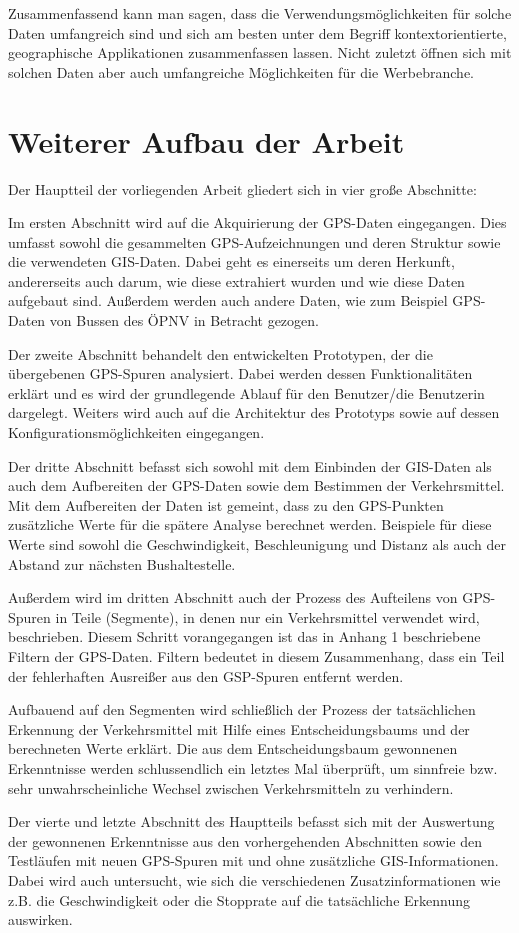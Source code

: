 Zusammenfassend kann man sagen, dass die Verwendungsmöglichkeiten für solche Daten umfangreich sind und sich am besten unter dem Begriff kontextorientierte, geographische Applikationen  zusammenfassen lassen. Nicht zuletzt öffnen sich mit solchen Daten aber auch umfangreiche Möglichkeiten für die Werbebranche.

\section{Weiterer Aufbau der Arbeit}
Der Hauptteil der vorliegenden Arbeit gliedert sich in vier große Abschnitte:

Im ersten Abschnitt wird auf die Akquirierung der GPS-Daten eingegangen. Dies umfasst sowohl die gesammelten GPS-Aufzeichnungen und deren Struktur sowie die verwendeten GIS-Daten. Dabei geht es einerseits um deren Herkunft, andererseits auch darum, wie diese extrahiert wurden und wie diese Daten aufgebaut sind. Außerdem werden auch andere Daten, wie zum Beispiel GPS-Daten von Bussen des ÖPNV in Betracht gezogen.

Der zweite Abschnitt behandelt den entwickelten Prototypen, der die übergebenen GPS-Spuren analysiert. Dabei werden dessen Funktionalitäten erklärt und es wird der grundlegende Ablauf für den Benutzer/die Benutzerin dargelegt. Weiters wird auch auf die Architektur des Prototyps sowie auf dessen Konfigurationsmöglichkeiten eingegangen.

Der dritte Abschnitt befasst sich sowohl mit dem Einbinden der GIS-Daten als auch dem Aufbereiten der GPS-Daten sowie dem Bestimmen der Verkehrsmittel. Mit dem Aufbereiten der Daten ist gemeint, dass zu den GPS-Punkten zusätzliche Werte für die spätere Analyse berechnet werden. Beispiele für diese Werte sind sowohl die Geschwindigkeit, Beschleunigung und Distanz als auch der Abstand zur nächsten Bushaltestelle. 

Außerdem wird im dritten Abschnitt auch der Prozess des Aufteilens von GPS-Spuren in Teile (Segmente), in denen nur ein Verkehrsmittel verwendet wird, beschrieben. Diesem Schritt vorangegangen ist das in Anhang 1 beschriebene Filtern der GPS-Daten. Filtern bedeutet in diesem Zusammenhang, dass ein Teil der fehlerhaften Ausreißer aus den GSP-Spuren entfernt werden.

Aufbauend auf den Segmenten wird schließlich der Prozess der tatsächlichen Erkennung der Verkehrsmittel mit Hilfe eines Entscheidungsbaums und der berechneten Werte erklärt. Die aus dem Entscheidungsbaum gewonnenen Erkenntnisse werden schlussendlich ein letztes Mal überprüft, um sinnfreie bzw. sehr unwahrscheinliche Wechsel zwischen Verkehrsmitteln zu verhindern. 

Der vierte und letzte Abschnitt des Hauptteils befasst sich mit der Auswertung der gewonnenen Erkenntnisse aus den vorhergehenden Abschnitten sowie den Testläufen mit neuen GPS-Spuren mit und ohne zusätzliche GIS-Informationen. Dabei wird auch untersucht, wie sich die verschiedenen Zusatzinformationen wie z.B. die Geschwindigkeit oder die Stopprate auf die tatsächliche Erkennung auswirken.
